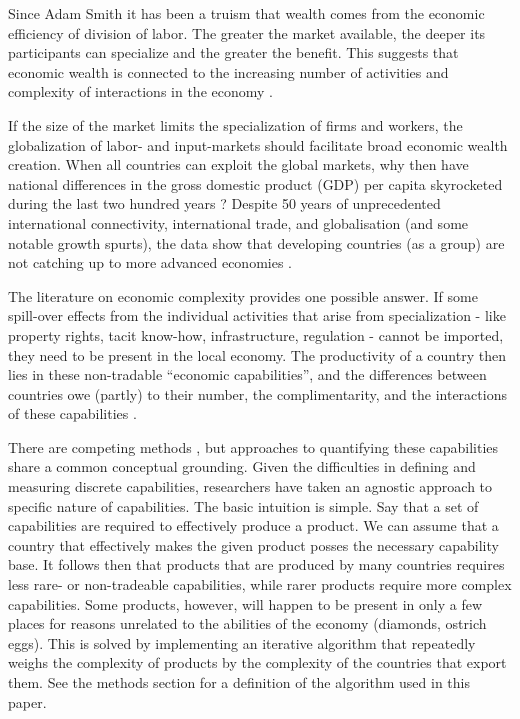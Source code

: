 \documentclass[11pt]{article}
\begin{document}
Since Adam Smith it has been a truism that wealth comes from the economic efficiency of division of labor. The greater the market available, the deeper its participants can specialize and the greater the benefit. This suggests that economic wealth is connected to the increasing number of activities and complexity of interactions in the economy \citep{romer_endogenous_1990}.

If the size of the market limits the specialization of firms and workers, the globalization of labor- and input-markets should facilitate broad economic wealth creation. When all countries can exploit the global markets, why then have national differences in the gross domestic product (GDP) per capita skyrocketed during the last two hundred years \citep{pritchett_divergence_1997}? Despite 50 years of unprecedented international connectivity, international trade, and globalisation (and some notable growth spurts), the data show that developing countries (as a group) are not catching up to more advanced economies \citep{johnson_what_2020}.

The literature on economic complexity provides one possible answer. If some spill-over effects from the individual activities that arise from  specialization - like property rights, tacit know-how, infrastructure, regulation - cannot be imported, they need to be present in the local economy. The productivity of a country then lies in these non-tradable ``economic capabilities'', and the differences between countries owe (partly) to their number, the complimentarity, and the interactions of these capabilities \citep{hidalgo_product_2007,hausmann_atlas_2013}.

There are competing methods \citep{tacchella_new_2012,hidalgo_building_2009,inoua_simple_2016}, but approaches to quantifying these capabilities share a common conceptual grounding. Given the difficulties in defining and measuring discrete capabilities, researchers have taken an agnostic approach to specific nature of capabilities. The basic intuition is simple. Say that a set of capabilities are required to effectively produce a product. We can assume that a country that effectively makes the given product posses the necessary capability base. It follows then that products that are produced by many countries requires less rare- or non-tradeable capabilities, while rarer products require more complex capabilities. Some products, however, will happen to be present in only a few places for reasons unrelated to the abilities of the economy (diamonds, ostrich eggs). This is solved by implementing an iterative algorithm that repeatedly weighs the complexity of products by the complexity of the countries that export them. See the methods section for a definition of the algorithm used in this paper.
\end{document}
